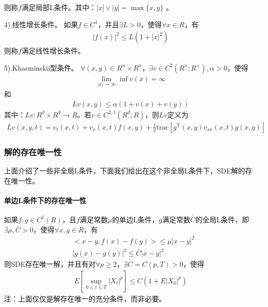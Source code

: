             则称$f$满足局部L条件。其中：$|x|\vee |y| = \max\{x,y\} $ 。
            \par
            4).线性增长条件。
            如果$f\in C^1$，并且$\exists L>0$，使得$\forall x\in R$，有
            \begin{align*}
                |f(x)|^2 \leqslant L(1+|x|^2)
            \end{align*}
            则称$f$满足线性增长条件。
            \par
            5).Khasminskii型条件。
            $\forall (x,y)\in R^n\times R^n$，$\exists v\in C^2(R^n;R^+),\alpha > 0$，使得
            \begin{align*}
            \lim_{|x|\rightarrow \infty} \inf v(x) = \infty
            \end{align*}
            和
            \begin{align*}
                Lv(x,y) \leqslant \alpha (1+v(x)+ v(y))
            \end{align*}
            其中：$Lv:R^d\times R^d \rightarrow R$。若$v\in C^{2,1}(R^d;R)$，则$Lv$定义为
            \begin{align*}
                Lv(x,y,t) = v_t(x,t) + v_x(x,t)f(x,y) + \frac 12\mathrm{trac}\left[g^{\mathrm{T}}(x,y)v_{xx}(x,t)g(x,y)\right]
            \end{align*}

        \subsubsection{解的存在唯一性}
            \par
            上面介绍了一些非全局L条件，下面我们给出在这个非全局L条件下，SDE解的存在唯一性。
            \paragraph{单边L条件下的存在唯一性}
            如果$f,g\in C^1(R)$，且$f$满足常数$\mu$的单边L条件，$g$满足常数$\bar{C}$的全局L条件，即$\exists \mu, \bar{C}>0$，使得$\forall x,y \in R$，有
            \begin{align*}
            &\bigl<x-y,f(x)-f(y)\bigr> \leqslant \mu |x-y|^2\\
            &|g(x)- g(y) |^2 \leqslant \bar{C}|x-y|^2
            \end{align*}
            则SDE存在唯一解，并且有对$\forall p \geqslant 2$，$\exists C = C(p,T)>0$，使得
            \begin{align*}
            E \left[ \sup_{0 \leqslant t \leqslant T} |X_t|^p\right] \leqslant C(1+E|X_0|^p)
            \end{align*}
            注：上面仅仅是解存在唯一的充分条件，而非必要。
